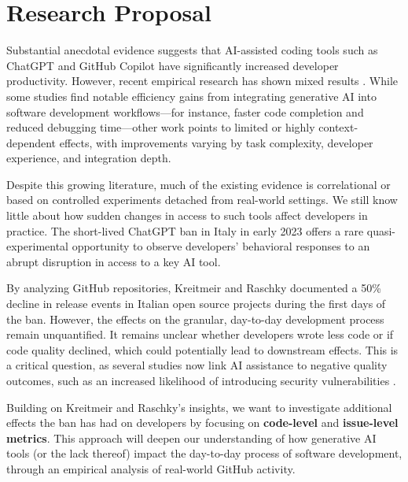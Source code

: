 \section*{Research Proposal}

Substantial anecdotal evidence suggests that AI-assisted coding tools such as ChatGPT \cite{openai_chatgpt} and GitHub Copilot have significantly increased developer productivity. However, recent empirical research has shown mixed results \cite{cui2025the, paradis2024doesaiimpactdevelopment, peng2023impactaideveloperproductivity}. While some studies find notable efficiency gains from integrating generative AI into software development workflows—for instance, faster code completion and reduced debugging time—other work points to limited or highly context-dependent effects, with improvements varying by task complexity, developer experience, and integration depth.

Despite this growing literature, much of the existing evidence is correlational or based on controlled experiments detached from real-world settings. We still know little about how sudden changes in access to such tools affect developers in practice. The short-lived ChatGPT ban in Italy in early 2023 \cite{garante_ban_2023} offers a rare quasi-experimental opportunity to observe developers’ behavioral responses to an abrupt disruption in access to a key AI tool.

By analyzing GitHub repositories, Kreitmeir and Raschky \cite{Kreitmeir2023} documented a 50\% decline in release events in Italian open source projects during the first days of the ban. However, the effects on the granular, day-to-day development process remain unquantified. It remains unclear whether developers wrote less code or if code quality declined, which could potentially lead to downstream effects. This is a critical question, as several studies now link AI assistance to negative quality outcomes, such as an increased likelihood of introducing security vulnerabilities \cite{fu2025securityweaknessescopilotgeneratedcode, pearce2021asleepkeyboardassessingsecurity}.

Building on Kreitmeir and Raschky's insights, we want to investigate additional effects the ban has had on developers by focusing on \textbf{code-level} and \textbf{issue-level metrics}. This approach will deepen our understanding of how generative AI tools (or the lack thereof) impact the day-to-day process of software development, through an empirical analysis of real-world GitHub activity.

